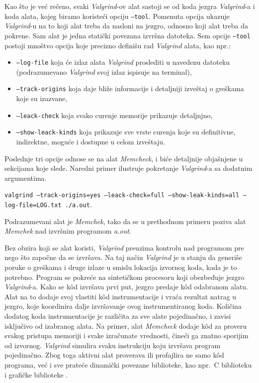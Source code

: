 \documentclass[12pt,oneside]{memoir}
\theoremstyle{plain}
\theoremstyle{definition}
\begin{document}
Kao što je već rečeno, svaki \textit{Valgrind}-ov alat sastoji se od koda jezgra \textit{Valgrind}-a i koda alata, kojeg biramo koristeći opciju \texttt{--tool}. Pomenuta opcija ukazuje \textit{Valgrind}-u na to koji alat treba da nasloni na jezgro, odnosno koji alat treba da pokrene. Sam alat je jedna statički povezana izvršna datoteka. Sem opcije \texttt{--tool} postoji mnoštvo opcija koje precizno definišu rad \textit{Valgrind} alata, kao npr.:
\begin{itemize}
\item \texttt{--log-file}  koja će izlaz alata \textit{Valgrind} proslediti u navedenu datoteku (podrazumevano \textit{Valgrind} svoj izlaz ispisuje na terminal),
\item \texttt{--track-origins} koja daje bliže informacije i detaljniji izveštaj o greškama koje su izazvane, 
\item \texttt{--leack-check} koja svako curenje memorije prikazuje detaljnjno,
\item \texttt{--show-leack-kinds} koja prikazuje sve vrste curenja koje su definitivne, indirektne, moguće i dostupne u celom izveštaju.
\end{itemize} 
Poslednje tri opcije odnose se na alat \textit{Memcheck}, i biće detaljnije objašnjene u sekcijama koje slede. Naredni primer ilustruje pokretanje \textit{Valgrind}-a sa dodatnim argumentima.
\begin{center}
\texttt{valgrind --track-origins=yes --leack-check=full --show-leak-kinds=all --log-file=LOG.txt ./a.out}.
\end{center}
Podrazumevani alat je \textit{Memchek}, tako da se u prethodnom primeru poziva alat \textit{Memchek} nad izvršnim programom \textit{a.out}.

Bez obzira koji se alat koristi, \textit{Valgrind} preuzima kontrolu nad  programom pre nego što započne da se izvršava. Na taj način \textit{Valgrind} je u stanju da generiše poruke o greškama i druge izlaze u smislu lokacija izvornog koda, kada je to potrebno. Program se pokreće na sintetičkom procesoru koji obezbeđuje jezgro \textit{Valgrind}-a. Kako se k\^od izvršava prvi put, jezgro predaje k\^od odabranom alatu. Alat na to dodaje svoj vlastiti k\^od instrumentacije i vraća rezultat natrag u jezgro, koje koordinira dalje izvršavanje ovog instrumentiranog koda. Količina dodatog koda instrumentacije je različita za sve alate pojedinačno, i zavisi isključivo od izabranog alata. Na primer, alat \textit{Memcheck} dodaje k\^od za proveru svakog pristupa memoriji i svake izračunate vrednosti, čineći ga znatno sporijim od izvornog. \textit{Valgrind} simulira svaku instrukciju koju izvršava program pojedinačno. Zbog toga aktivni alat proverava ili profajlira ne samo k\^od programa, već i sve prateće dinamički povezane biblioteke, kao npr.~C biblioteku i grafičke biblioteke \cite{ValgrindCore}.
\end{document}
